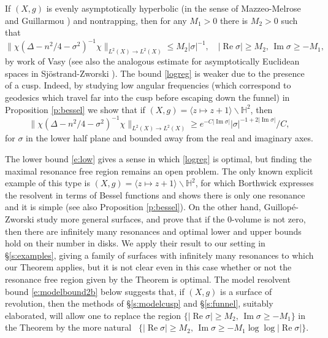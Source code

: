 \documentclass[reqno, 12pt]{amsart}
\newcommand \C {\mathbb{C}}
\newcommand \Hh {\mathbb{H}}
\DeclareMathOperator \re {Re}
\DeclareMathOperator \im {Im}
\theoremstyle{definition}
\numberwithin{equation}{section}
\numberwithin{prop}{section}
\numberwithin{figure}{section}
\begin{document}
If  $(X,g)$ is evenly asymptotically hyperbolic (in the sense of Mazzeo-Melrose \cite{m} and Guillarmou \cite{g}) and nontrapping, then for any $M_1>0$ there is $M_2>0$ such that
\begin{equation}\label{e:eucbetter} 
\|\chi(\Delta - n^2/4 - \sigma^2)^{-1}\chi\|_{L^2(X) \to L^2(X)} \le M_2|\sigma|^{-1}, \quad |\re \sigma| \ge M_2,\, \im \sigma \ge - M_1,
\end{equation}
by work of Vasy \cite[(1.1)]{Vasy} (see also the analogous estimate for asymptotically Euclidean spaces in Sj\"ostrand-Zworski \cite[Theorem $1'$]{sz}). The bound \eqref{logreg} is weaker due to the presence of a cusp. Indeed, by studying low angular frequencies (which correspond to geodesics which travel far into the cusp before escaping down the funnel) in Proposition \ref{p:bessel} we show that if $(X,g) = \langle z \mapsto z+1 \rangle\backslash \Hh^2$, then
\begin{equation}\label{e:low}
\|\chi(\Delta - n^2/4 - \sigma^2)^{-1}\chi\|_{L^2(X) \to L^2(X)} \ge e^{-C|\im\sigma|}|\sigma|^{-1+2|\im \sigma|}/C,
\end{equation}
for $\sigma$ in the lower half plane and bounded away from the real and imaginary axes. 

The lower bound \eqref{e:low} gives a sense in which \eqref{logreg} is optimal, but  finding the maximal resonance free region remains an open problem. The only known explicit example of this type is $(X,g) = \langle z \mapsto z+1 \rangle \backslash \Hh^2$, for which Borthwick \cite[\S5.3]{b} expresses the resolvent in terms of Bessel functions and shows  %
 there is only one resonance and it is simple (see also Proposition \ref{p:bessel}). On the other hand, Guillop\'e-Zworski \cite{gz} study more general surfaces, and prove that if the $0$-volume is not zero, then there are infinitely many resonances and optimal lower and upper bounds hold on their number in disks. We apply their result to our setting in \S\ref{s:examples}, giving a family of surfaces  with infinitely many resonances to which our Theorem applies, but it is not clear even in this case whether or not  the resonance free region given by the Theorem is optimal. The model resolvent bound \eqref{e:modelbound2b} below suggests that, if $(X,g)$ is a surface of revolution, then the methods of \S\ref{s:modelcusp} and \S\ref{s:funnel}, suitably elaborated, will allow one to replace the region $\{|\re \sigma| \ge M_2,\, \im \sigma \ge - M_1\}$  in the Theorem
by the more natural \ $\{|\re \sigma| \ge M_2,\, \im \sigma \ge - M_1 \log\log|\re\sigma|\}$.
\end{document}
